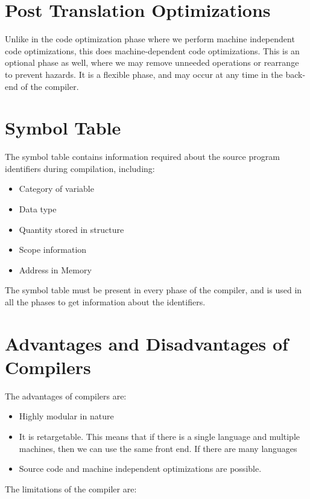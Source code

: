 \documentclass[12pt,letterpaper]{amsbook}
\theoremstyle{definition}
\begin{document}
\section{Post Translation Optimizations}

Unlike in the code optimization phase where we perform machine independent code optimizations, this does machine-dependent code optimizations. This is an optional phase as well, where we may remove unneeded operations or rearrange to prevent hazards. It is a flexible phase, and may occur at any time in the back-end of the compiler.

\section{Symbol Table}

The symbol table contains information required about the source program identifiers during compilation, including:

\begin{itemize}
  \item Category of variable
  \item Data type
  \item Quantity stored in structure
  \item Scope information
  \item Address in Memory
\end{itemize}

The symbol table must be present in every phase of the compiler, and is used in all the phases to get information about the identifiers.

\section{Advantages and Disadvantages of Compilers}

The advantages of compilers are:

\begin{itemize}
  \item Highly modular in nature
  \item It is retargetable. This means that if there is a single language and multiple machines, then we can use the same front end. If there are many languages
  \item Source code and machine independent optimizations are possible.
\end{itemize}

The limitations of the compiler are:
\end{document}
